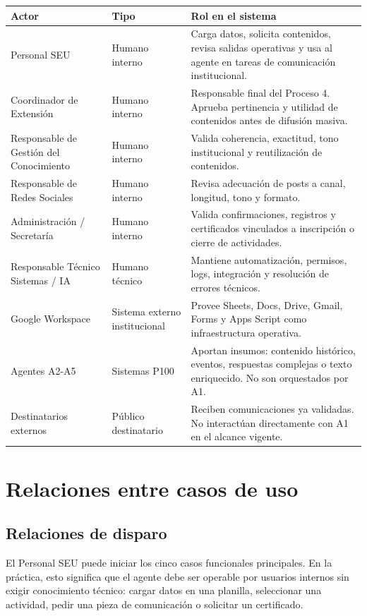 \documentclass[11pt,a4paper]{article}
\begin{document}
\begin{longtable}{p{}p{}p{}}
\toprule
\textbf{Actor} & \textbf{Tipo} & \textbf{Rol en el sistema} \\
\midrule
\endhead
Personal SEU & Humano interno & Carga datos, solicita contenidos, revisa salidas operativas y usa al agente en tareas de comunicación institucional. \\
Coordinador de Extensión & Humano interno & Responsable final del Proceso 4. Aprueba pertinencia y utilidad de contenidos antes de difusión masiva. \\
Responsable de Gestión del Conocimiento & Humano interno & Valida coherencia, exactitud, tono institucional y reutilización de contenidos. \\
Responsable de Redes Sociales & Humano interno & Revisa adecuación de posts a canal, longitud, tono y formato. \\
Administración / Secretaría & Humano interno & Valida confirmaciones, registros y certificados vinculados a inscripción o cierre de actividades. \\
Responsable Técnico Sistemas / IA & Humano técnico & Mantiene automatización, permisos, logs, integración y resolución de errores técnicos. \\
Google Workspace & Sistema externo institucional & Provee Sheets, Docs, Drive, Gmail, Forms y Apps Script como infraestructura operativa. \\
Agentes A2-A5 & Sistemas P100 & Aportan insumos: contenido histórico, eventos, respuestas complejas o texto enriquecido. No son orquestados por A1. \\
Destinatarios externos & Público destinatario & Reciben comunicaciones ya validadas. No interactúan directamente con A1 en el alcance vigente. \\
\bottomrule
\end{longtable}

\section{Relaciones entre casos de uso}

\subsection{Relaciones de disparo}

El Personal SEU puede iniciar los cinco casos funcionales principales. En la práctica, esto significa que el agente debe ser operable por usuarios internos sin exigir conocimiento técnico: cargar datos en una planilla, seleccionar una actividad, pedir una pieza de comunicación o solicitar un certificado.
\end{document}
